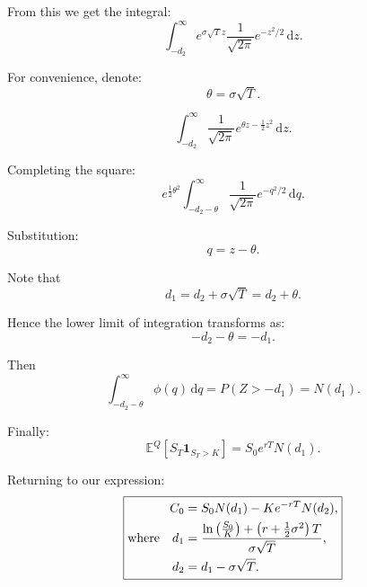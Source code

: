 \documentclass[12pt]{article}
\newcommand{\dd}{\,\mathrm{d}}
\begin{document}
From this we get the integral:
\[
\int_{-d_2}^{\infty}
e^{\sigma\sqrt{T}z}
\frac{1}{\sqrt{2\pi}}e^{-z^2/2}\dd z.
\]

For convenience, denote:
\[
\theta=\sigma\sqrt{T}.
\]

\[
\int_{-d_2}^{\infty}
\frac{1}{\sqrt{2\pi}}
e^{\theta z-\frac12 z^2}\dd z.
\]

Completing the square:
\[
e^{\frac12\theta^2}
\int_{-d_2-\theta}^{\infty}
\frac{1}{\sqrt{2\pi}}e^{-q^2/2}\dd q.
\]

Substitution:
\[
q=z-\theta.
\]

Note that
\[
d_1=d_2+\sigma\sqrt{T}=d_2+\theta.
\]

Hence the lower limit of integration transforms as:
\[
-d_2-\theta=-d_1.
\]

Then
\[
\int_{-d_2-\theta}^{\infty}\phi(q)\dd q
=
P(Z>-d_1)=N(d_1).
\]

Finally:
\[
\mathbb{E}^Q[S_T\mathbf{1}_{S_T>K}]
=
S_0 e^{rT}N(d_1).
\]

Returning to our expression:
\begin{equation}
\fbox{$\displaystyle
\begin{aligned}
C_0 &= S_0N(d_1) - K e^{-rT}N(d_2),\\
\text{where}\quad d_1 &= \frac{\ln\left(\frac{S_0}{K}\right) + \left(r+\frac12\sigma^2\right)T}{\sigma\sqrt{T}},\\
d_2 &= d_1 - \sigma\sqrt{T}.
\end{aligned}
$}
\end{equation}
\end{document}
